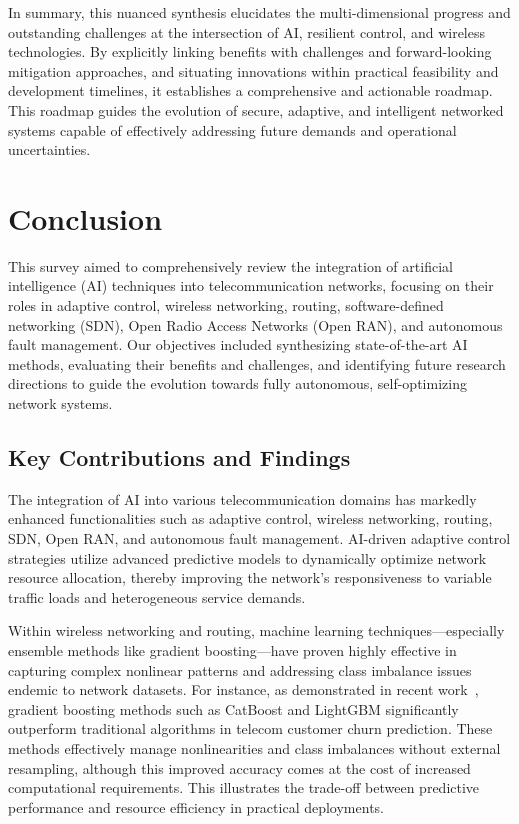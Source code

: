 \documentclass[sigconf]{acmart}
\begin{document}
In summary, this nuanced synthesis elucidates the multi-dimensional progress and outstanding challenges at the intersection of AI, resilient control, and wireless technologies. By explicitly linking benefits with challenges and forward-looking mitigation approaches, and situating innovations within practical feasibility and development timelines, it establishes a comprehensive and actionable roadmap. This roadmap guides the evolution of secure, adaptive, and intelligent networked systems capable of effectively addressing future demands and operational uncertainties.

\section{Conclusion}

This survey aimed to comprehensively review the integration of artificial intelligence (AI) techniques into telecommunication networks, focusing on their roles in adaptive control, wireless networking, routing, software-defined networking (SDN), Open Radio Access Networks (Open RAN), and autonomous fault management. Our objectives included synthesizing state-of-the-art AI methods, evaluating their benefits and challenges, and identifying future research directions to guide the evolution towards fully autonomous, self-optimizing network systems.

\subsection{Key Contributions and Findings}

The integration of AI into various telecommunication domains has markedly enhanced functionalities such as adaptive control, wireless networking, routing, SDN, Open RAN, and autonomous fault management. AI-driven adaptive control strategies utilize advanced predictive models to dynamically optimize network resource allocation, thereby improving the network’s responsiveness to variable traffic loads and heterogeneous service demands.

Within wireless networking and routing, machine learning techniques—especially ensemble methods like gradient boosting—have proven highly effective in capturing complex nonlinear patterns and addressing class imbalance issues endemic to network datasets. For instance, as demonstrated in recent work~\cite{ref17}, gradient boosting methods such as CatBoost and LightGBM significantly outperform traditional algorithms in telecom customer churn prediction. These methods effectively manage nonlinearities and class imbalances without external resampling, although this improved accuracy comes at the cost of increased computational requirements. This illustrates the trade-off between predictive performance and resource efficiency in practical deployments.
\end{document}
